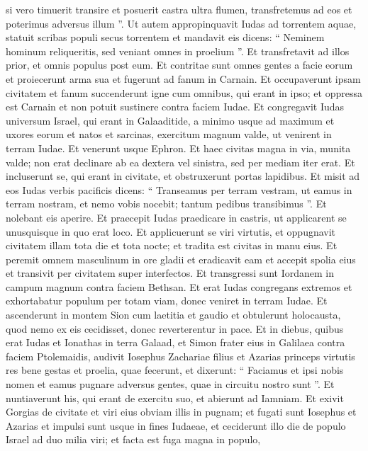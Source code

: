 \begin{biblechapter}
\begin{biblechapter}
\begin{biblechapter}
\begin{biblechapter}
\begin{biblechapter}
\verse si vero timuerit transire et posuerit castra ultra flumen, transfretemus ad eos et poterimus adversus illum ”. 
\verse Ut autem appropinquavit Iudas ad torrentem aquae, statuit scribas populi secus torrentem et mandavit eis dicens: “ Neminem hominum reliqueritis, sed veniant omnes in proelium ”. 
\verse Et transfretavit ad illos prior, et omnis populus post eum. Et contritae sunt omnes gentes a facie eorum et proiecerunt arma sua et fugerunt ad fanum in Carnain. 
\verse Et occupaverunt ipsam civitatem et fanum succenderunt igne cum omnibus, qui erant in ipso; et oppressa est Carnain et non potuit sustinere contra faciem Iudae. 
\verse Et congregavit Iudas universum Israel, qui erant in Galaaditide, a minimo usque ad maximum et uxores eorum et natos et sarcinas, exercitum magnum valde, ut venirent in terram Iudae. 
\verse Et venerunt usque Ephron. Et haec civitas magna in via, munita valde; non erat declinare ab ea dextera vel sinistra, sed per mediam iter erat.
 \verse Et incluserunt se, qui erant in civitate, et obstruxerunt portas lapidibus. Et misit ad eos Iudas verbis pacificis 
\verse dicens: “ Transeamus per terram vestram, ut eamus in terram nostram, et nemo vobis nocebit; tantum pedibus transibimus ”. Et nolebant eis aperire. 
\verse Et praecepit Iudas praedicare in castris, ut applicarent se unusquisque in quo erat loco. 
\verse Et applicuerunt se viri virtutis, et oppugnavit civitatem illam tota die et tota nocte; et tradita est civitas in manu eius. 
\verse Et peremit omnem masculinum in ore gladii et eradicavit eam et accepit spolia eius et transivit per civitatem super interfectos. 
\verse Et transgressi sunt Iordanem in campum magnum contra faciem Bethsan. 
\verse Et erat Iudas congregans extremos et exhortabatur populum per totam viam, donec veniret in terram Iudae. 
\verse Et ascenderunt in montem Sion cum laetitia et gaudio et obtulerunt holocausta, quod nemo ex eis cecidisset, donec reverterentur in pace.
 \verse Et in diebus, quibus erat Iudas et Ionathas in terra Galaad, et Simon frater eius in Galilaea contra faciem Ptolemaidis, 
\verse audivit Iosephus Zachariae filius et Azarias princeps virtutis res bene gestas et proelia, quae fecerunt, 
 \verse et dixerunt: “ Faciamus et ipsi nobis nomen et eamus pugnare adversus gentes, quae in circuitu nostro sunt ”. 
\verse Et nuntiaverunt his, qui erant de exercitu suo, et abierunt ad Iamniam. 
\verse Et exivit Gorgias de civitate et viri eius obviam illis in pugnam; 
\verse et fugati sunt Iosephus et Azarias et impulsi sunt usque in fines Iudaeae, et ceciderunt illo die de populo Israel ad duo milia viri; et facta est fuga magna in populo, 

\end{biblechapter}
\end{biblechapter}
\end{biblechapter}
\end{biblechapter}
\end{biblechapter}
